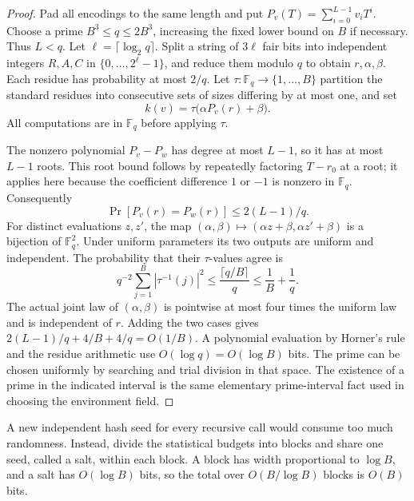 \begin{proof}
Pad all encodings to the same length and put
$P_v(T)=\sum_{i=0}^{L-1}v_iT^i$.  Choose a prime
$B^3\le q\le2B^3$, increasing the fixed lower bound on $B$ if necessary.
Thus $L<q$.  Let $\ell=\lceil\log_2q\rceil$.  Split a string of $3\ell$
fair bits into independent integers $R,A,C$ in $\{0,\ldots,2^\ell-1\}$,
and reduce them modulo $q$ to obtain $r,\alpha,\beta$.  Each residue has
probability at most $2/q$.  Let
$\tau:\mathbb F_q\longrightarrow\{1,\ldots,B\}$ partition the standard
residues into consecutive sets of sizes differing by at most one, and set
\[
 k(v)=\tau\bigl(\alpha P_v(r)+\beta\bigr).
\]
All computations are in $\mathbb F_q$ before applying $\tau$.

The nonzero polynomial $P_v-P_w$ has degree at most $L-1$, so it has at most
$L-1$ roots.  This root bound follows by repeatedly factoring $T-r_0$ at a
root; it applies here because the coefficient difference $1$ or $-1$ is
nonzero in $\mathbb F_q$.  Consequently
\[
 \Pr[P_v(r)=P_w(r)]\le 2(L-1)/q.
\]
For distinct evaluations $z,z'$, the map
$(\alpha,\beta)\mapsto(\alpha z+\beta,\alpha z'+\beta)$ is a bijection
of $\mathbb F_q^2$.  Under uniform parameters its two outputs are uniform
and independent.  The probability that their $\tau$-values agree is
\[
 q^{-2}\sum_{j=1}^B|\tau^{-1}(j)|^2
 \le \frac{\lceil q/B\rceil}{q}\le\frac1B+\frac1q.
\]
The actual joint law of $(\alpha,\beta)$ is pointwise at most four times
the uniform law and is independent of $r$.  Adding the two cases gives
$2(L-1)/q+4/B+4/q=O(1/B)$.  A polynomial evaluation by Horner's rule and
the residue arithmetic use $O(\log q)=O(\log B)$ bits.  The prime can be
chosen uniformly by searching and trial division in that space.  The
existence of a prime in the indicated interval is the same elementary
prime-interval fact used in choosing the environment field.
\end{proof}

A new independent hash seed for every recursive call would consume too much randomness. Instead, divide the statistical budgets into blocks and share one seed, called a salt, within each block. A block has width proportional to $\log B$, and a salt has $O(\log B)$ bits, so the total over $O(B/\log B)$ blocks is $O(B)$ bits.

